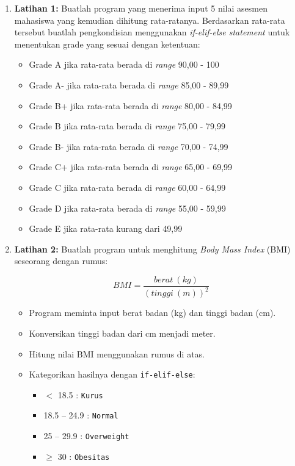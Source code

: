 \begin{enumerate}
\item \textbf{Latihan 1:} Buatlah program yang menerima input 5 nilai asesmen mahasiswa yang kemudian dihitung rata-ratanya. Berdasarkan rata-rata tersebut buatlah pengkondisian menggunakan \textit{if-elif-else statement} untuk menentukan grade yang sesuai dengan ketentuan:
\begin{itemize}
    \item Grade A jika rata-rata berada di \textit{range} 90,00 - 100
    \item Grade A- jika rata-rata berada di \textit{range} 85,00 - 89,99
    \item Grade B+ jika rata-rata berada di \textit{range} 80,00 - 84,99
    \item Grade B jika rata-rata berada di \textit{range} 75,00 - 79,99
    \item Grade B- jika rata-rata berada di \textit{range} 70,00 - 74,99
    \item Grade C+ jika rata-rata berada di \textit{range} 65,00 - 69,99
    \item Grade C jika rata-rata berada di \textit{range} 60,00 - 64,99
    \item Grade D jika rata-rata berada di \textit{range} 55,00 - 59,99
    \item Grade E jika rata-rata kurang dari 49,99
\end{itemize}

\item \textbf{Latihan 2:} Buatlah program untuk menghitung \textit{Body Mass Index} (BMI) seseorang dengan rumus:

\[
BMI = \frac{berat \ (kg)}{(tinggi \ (m))^2}
\]

\begin{itemize}
    \item Program meminta input berat badan (kg) dan tinggi badan (cm).
    \item Konversikan tinggi badan dari cm menjadi meter.
    \item Hitung nilai BMI menggunakan rumus di atas.
    \item Kategorikan hasilnya dengan \texttt{if-elif-else}:
    \begin{itemize}
        \item $<$ 18.5 : \texttt{Kurus}
        \item 18.5 -- 24.9 : \texttt{Normal}
        \item 25 -- 29.9 : \texttt{Overweight}
        \item $\geq$ 30 : \texttt{Obesitas}
    \end{itemize}
\end{itemize}


\end{enumerate}
